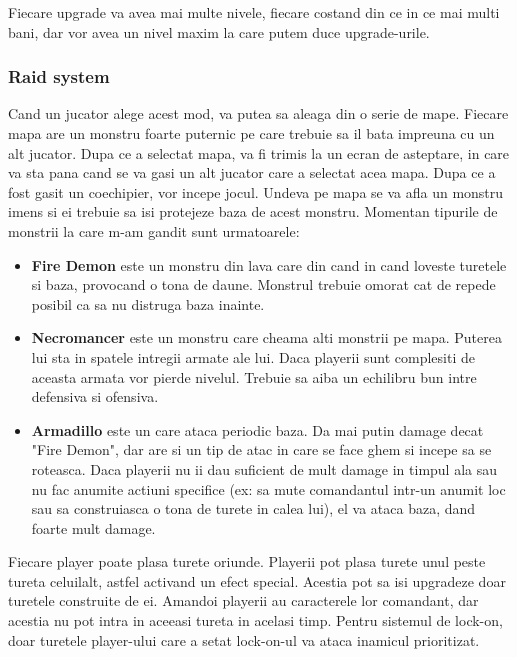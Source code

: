 \documentclass[12pt, a4paper]{article}
\begin{document}
	Fiecare upgrade va avea mai multe nivele, fiecare costand din ce in ce mai multi bani, dar vor avea un nivel maxim la care putem duce upgrade-urile.
	
	
	
	\subsubsection{Raid system}
	
	Cand un jucator alege acest mod, va putea sa aleaga din o serie de mape. Fiecare mapa are un monstru foarte puternic pe care trebuie sa il bata impreuna cu un alt jucator. Dupa ce a selectat mapa, va fi trimis la un ecran de asteptare, in care va sta pana cand se va gasi un alt jucator care a selectat acea mapa. Dupa ce a fost gasit un coechipier, vor incepe jocul. Undeva pe mapa se va afla un monstru imens si ei trebuie sa isi protejeze baza de acest monstru. Momentan tipurile de monstrii la care m-am gandit sunt urmatoarele:
	
	\begin{itemize}
		\item \textbf{Fire Demon} este un monstru din lava care din cand in cand loveste turetele si baza, provocand o tona de daune. Monstrul trebuie omorat cat de repede posibil ca sa nu distruga baza inainte.
		\item \textbf{Necromancer} este un monstru care cheama alti monstrii pe mapa. Puterea lui sta in spatele intregii armate ale lui. Daca playerii sunt complesiti de aceasta armata vor pierde nivelul. Trebuie sa aiba un echilibru bun intre defensiva si ofensiva.
		\item \textbf{Armadillo} este un care ataca periodic baza. Da mai putin damage decat "Fire Demon", dar are si un tip de atac in care se face ghem si incepe sa se roteasca. Daca playerii nu ii dau suficient de mult damage in timpul ala sau nu fac anumite actiuni specifice (ex: sa mute comandantul intr-un anumit loc sau sa construiasca o tona de turete in calea lui), el va ataca baza, dand foarte mult damage.
	\end{itemize}

	Fiecare player poate plasa turete oriunde. Playerii pot plasa turete unul peste tureta celuilalt, astfel activand un efect special. Acestia pot sa isi upgradeze doar turetele construite de ei. Amandoi playerii au caracterele lor comandant, dar acestia nu pot intra in aceeasi tureta in acelasi timp. Pentru sistemul de lock-on, doar turetele player-ului care a setat lock-on-ul va ataca inamicul prioritizat.
	
\end{document}
